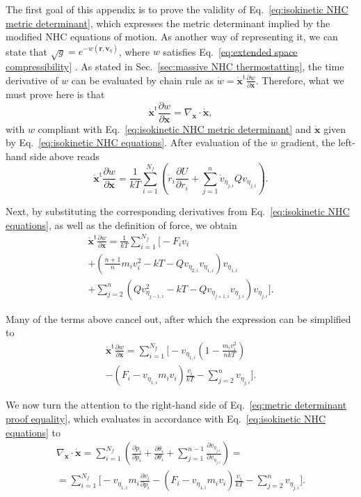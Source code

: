 \documentclass[
aip,
jcp,
reprint,
]{revtex4-1}
\newcommand{\vt}[1]{\boldsymbol{\mathbf{#1}}}          %
\newcommand{\tr}[1]{#1^\text{t}}                       %
\newcommand{\diff}[2]{\frac{\partial #2}{\partial #1}} %
\begin{document}
The first goal of this appendix is to prove the validity of Eq.~\eqref{eq:isokinetic NHC metric determinant}, which expresses the metric determinant implied by the modified NHC equations of motion.
As another way of representing it, we can state that $\sqrt{g} = e^{-w(\vt r, \vt v_\eta)}$, where $w$ satisfies Eq.~\eqref{eq:extended space compressibility} \cite{Tuckerman_1999, Tuckerman_2001}.
As stated in Sec.~\ref{sec:massive NHC thermostatting}, the time derivative of $w$ can be evaluated by chain rule as $\dot{w} = \tr{\dot{\vt x}} \diff{\vt x}{w}$.
Therefore, what we must prove here is that \cite{Ezra_2004}
\begin{equation}
\label{eq:metric determinant proof equality}
\tr{\dot{\vt x}} \diff{\vt x}{w} = \nabla_{\vt x} \cdot \dot{\vt x},
\end{equation}
with $w$ compliant with Eq.~\eqref{eq:isokinetic NHC metric determinant} and $\dot{\vt x}$ given by Eq.~\eqref{eq:isokinetic NHC equations}.
After evaluation of the $w$ gradient, the left-hand side above reads
\begin{equation*}
\tr{\dot{\vt x}} \diff{\vt x}{w} = \frac{1}{kT} \sum_{i=1}^{N_f} \left(\dot{r}_i \diff{r_i}{U} + \sum_{j=1}^n \dot{v}_{\eta_{j,i}} Q v_{\eta_{j,i}} \right).
\end{equation*}

Next, by substituting the corresponding derivatives from Eq.~\eqref{eq:isokinetic NHC equations}, as well as the definition of force, we obtain
\begin{multline*}
\tr{\dot{\vt x}} \diff{\vt x}{w} = \frac{1}{kT} \sum_{i=1}^{N_f} \Bigg[-F_i v_i \\ 
+ \left(\frac{n+1}{n} m_i v_i^2 - kT - Q v_{\eta_{2, i}} v_{\eta_{1, i}}\right) v_{\eta_{1,i}} \\
+ \sum_{j=2}^n \left(Q v_{\eta_{j-1, i}}^2 - kT - Q v_{\eta_{j+1, i}} v_{\eta_{j, i}}\right) v_{\eta_{j,i}} \Bigg].
\end{multline*}

Many of the terms above cancel out, after which the expression can be simplified to
\begin{multline*}
\tr{\dot{\vt x}} \diff{\vt x}{w} = \sum_{i=1}^{N_f} \bigg[- v_{\eta_{1,i}}\left(1 - \frac{m_i v_i^2}{n kT}\right) \\
-\left(F_i - v_{\eta_{1,i}} m_i v_i\right) \frac{v_i}{kT} - \sum_{j=2}^n v_{\eta_{j,i}} \bigg].
\end{multline*}

We now turn the attention to the right-hand side of Eq.~\eqref{eq:metric determinant proof equality}, which evaluates in accordance with Eq.~\eqref{eq:isokinetic NHC equations} to
\begin{multline*}
\nabla_{\vt x} \cdot \dot{\vt x} = \sum_{i=1}^{N_f} \left(\diff{p_i}{\dot{p}_i} + \diff{\theta_i}{\dot{\theta}_i} + \sum_{j=1}^{n-1} \diff{v_{\eta_{j,i}}}{\dot{v}_{\eta_{j,i}}}\right) = \\
= \sum_{i=1}^{N_f} \Bigg[- v_{\eta_{1,i}} m_i \diff{p_i}{v_i} - \left(F_i - v_{\eta_{1,i}} m_i v_i\right) \frac{v_i}{kT} - \sum_{j=2}^n v_{\eta_{j,i}} \Bigg].
\end{multline*}
\end{document}
